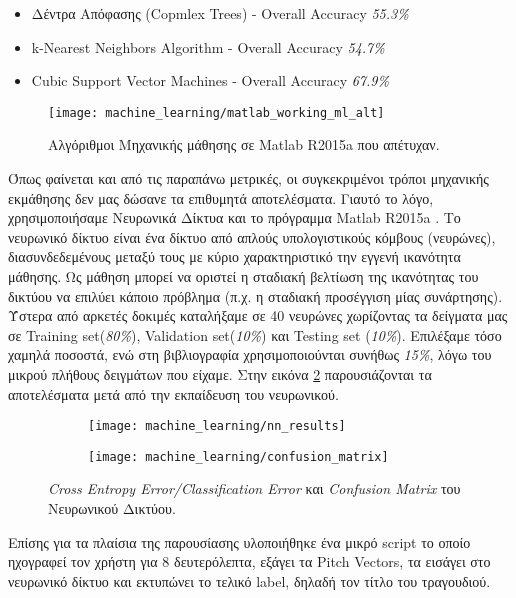 \begin{itemize}
  \item Δέντρα Απόφασης (Copmlex Trees) - Overall Accuracy \textit{55.3\%}  
  \item k-Nearest Neighbors Algorithm 	- Overall Accuracy \textit{54.7\%}
  \item Cubic Support Vector Machines	- Overall Accuracy \textit{67.9\%}
\end{itemize}

\begin{figure}
        \centering
        \vspace{-20pt}\texttt{[image: machine\_learning/matlab\_working\_ml\_alt]}
        \vspace{-20pt}\caption{Αλγόριθμοι Μηχανικής μάθησης σε Matlab R2015a \cite{matlab} που απέτυχαν.}
        \label{fig:matlab_ml_alg}
\end{figure}

Όπως φαίνεται και από τις παραπάνω μετρικές, οι συγκεκριμένοι τρόποι μηχανικής εκμάθησης δεν μας δώσανε τα επιθυμητά αποτελέσματα. Γιαυτό το λόγο, χρησιμοποιήσαμε Νευρωνικά Δίκτυα και το πρόγραμμα Matlab R2015a \cite{matlab}. Το νευρωνικό δίκτυο είναι ένα δίκτυο από απλούς υπολογιστικούς κόμβους (νευρώνες), διασυνδεδεμένους μεταξύ τους με κύριο χαρακτηριστικό την εγγενή ικανότητα μάθησης. Ως μάθηση μπορεί να οριστεί η σταδιακή βελτίωση της ικανότητας του δικτύου να επιλύει κάποιο πρόβλημα (π.χ. η σταδιακή προσέγγιση μίας συνάρτησης)\cite{neural_net}. Ύστερα από αρκετές δοκιμές καταλήξαμε σε 40 νευρώνες χωρίζοντας τα δείγματα μας σε Training set(\textit{80\%}), Validation set(\textit{10\%}) και Testing set (\textit{10\%}). Επιλέξαμε τόσο χαμηλά ποσοστά, ενώ στη βιβλιογραφία χρησιμοποιούνται συνήθως \textit{15\%}, λόγω του μικρού πλήθους δειγμάτων που είχαμε. Στην εικόνα \ref{fig:matlab-results} παρουσιάζονται τα αποτελέσματα μετά από την εκπαίδευση του νευρωνικού.

\begin{figure}[htb]
    \centering
    \begin{subfigure}{0.5\linewidth}
        \texttt{[image: machine\_learning/nn\_results]}
    \end{subfigure}\hfill
    \begin{subfigure}{\linewidth}
        \texttt{[image: machine\_learning/confusion\_matrix]}
    \end{subfigure}
    \caption{\textit{Cross Entropy Error/Classification Error} και \textit{Confusion Matrix} του Νευρωνικού Δικτύου.}
    \label{fig:matlab-results}
\end{figure}

Επίσης για τα πλαίσια της παρουσίασης υλοποιήθηκε ένα μικρό script το οποίο ηχογραφεί τον χρήστη για 8 δευτερόλεπτα, εξάγει τα Pitch Vectors, τα εισάγει στο νευρωνικό δίκτυο και εκτυπώνει το τελικό label, δηλαδή τον τίτλο του τραγουδιού. 